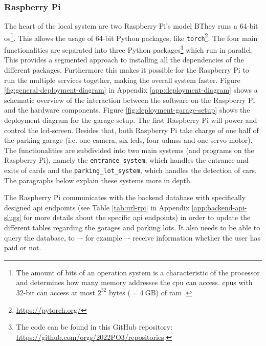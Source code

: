 \subsubsection{Raspberry Pi}
The heart of the local system are two Raspberry Pi's model B\. They runs a 64-bit \ac{os}\footnote{The amount of bits of an operation system is a characteristic of the processor and determines how many memory addresses the \ac{cpu} can access. \ac{cpu}s with 32-bit can access at most $2^{32}$ bytes ($= 4 \ \text{GB}$) of \ac{ram} \cite{bit-cpu}.}. This allows the usage of 64-bit Python packages, like \texttt{torch}\footnote{\url{https://pytorch.org/}}. The four main functionalities are separated into three Python packages\footnote{The code can be found in this GitHub repository: \url{https://github.com/orgs/2022PO3/repositories}.} which run in parallel. This provides a segmented approach to installing all the dependencies of the different packages. Furthermore this makes it possible for the Raspberry Pi to run the multiple services together, making the overall system faster. Figure \ref{fig:general-deployment-diagram} in Appendix \ref{app:deployment-diagram} shows a schematic overview of the interaction between the software on the Raspberry Pi and the hardware components. Figure \ref{fig:deployment-garage-setup} shows the deployment diagram for the garage setup. The first Raspberry Pi will power and control the \ac{lcd}-screen. Besides that, both Raspberry Pi take charge of one half of the parking garage (i.e. one camera, six \acp{led}, four \acp{udms} and one servo motor). The functionalities are subdivided into two main systems (and programs on the Raspberry Pi), namely the \verb|entrance_system|, which handles the entrance and exits of cards and the \verb|parking_lot_system|, which handles the detection of cars. The paragraphs below explain these systems more in depth.

\ind The Raspberry Pi communicates with the backend database with specifically designed \ac{api} endpoints (see Table \ref{tab:url-rpi} in Appendix \ref{app:backend-api-slugs} for more details about the specific \ac{api} endpoints) in order to update the different tables regarding the garages and parking lots. It also needs to be able to query the database, to –- for example –- receive information whether the user has paid or not. 


